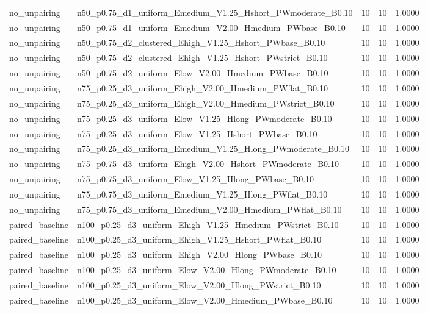 \begin{tabular}{llrrr}
no_unpairing & n50_p0.75_d1_uniform_Emedium_V1.25_Hshort_PWmoderate_B0.10 & 10 & 10 & 1.0000 \\
no_unpairing & n50_p0.75_d1_uniform_Emedium_V2.00_Hmedium_PWbase_B0.10 & 10 & 10 & 1.0000 \\
no_unpairing & n50_p0.75_d2_clustered_Ehigh_V1.25_Hshort_PWbase_B0.10 & 10 & 10 & 1.0000 \\
no_unpairing & n50_p0.75_d2_clustered_Ehigh_V1.25_Hshort_PWstrict_B0.10 & 10 & 10 & 1.0000 \\
no_unpairing & n50_p0.75_d2_uniform_Elow_V2.00_Hmedium_PWbase_B0.10 & 10 & 10 & 1.0000 \\
no_unpairing & n75_p0.25_d3_uniform_Ehigh_V2.00_Hmedium_PWflat_B0.10 & 10 & 10 & 1.0000 \\
no_unpairing & n75_p0.25_d3_uniform_Ehigh_V2.00_Hmedium_PWstrict_B0.10 & 10 & 10 & 1.0000 \\
no_unpairing & n75_p0.25_d3_uniform_Elow_V1.25_Hlong_PWmoderate_B0.10 & 10 & 10 & 1.0000 \\
no_unpairing & n75_p0.25_d3_uniform_Elow_V1.25_Hshort_PWbase_B0.10 & 10 & 10 & 1.0000 \\
no_unpairing & n75_p0.25_d3_uniform_Emedium_V1.25_Hlong_PWmoderate_B0.10 & 10 & 10 & 1.0000 \\
no_unpairing & n75_p0.75_d3_uniform_Ehigh_V2.00_Hshort_PWmoderate_B0.10 & 10 & 10 & 1.0000 \\
no_unpairing & n75_p0.75_d3_uniform_Elow_V1.25_Hlong_PWbase_B0.10 & 10 & 10 & 1.0000 \\
no_unpairing & n75_p0.75_d3_uniform_Emedium_V1.25_Hlong_PWflat_B0.10 & 10 & 10 & 1.0000 \\
no_unpairing & n75_p0.75_d3_uniform_Emedium_V2.00_Hmedium_PWflat_B0.10 & 10 & 10 & 1.0000 \\
paired_baseline & n100_p0.25_d3_uniform_Ehigh_V1.25_Hmedium_PWstrict_B0.10 & 10 & 10 & 1.0000 \\
paired_baseline & n100_p0.25_d3_uniform_Ehigh_V1.25_Hshort_PWflat_B0.10 & 10 & 10 & 1.0000 \\
paired_baseline & n100_p0.25_d3_uniform_Ehigh_V2.00_Hlong_PWbase_B0.10 & 10 & 10 & 1.0000 \\
paired_baseline & n100_p0.25_d3_uniform_Elow_V2.00_Hlong_PWmoderate_B0.10 & 10 & 10 & 1.0000 \\
paired_baseline & n100_p0.25_d3_uniform_Elow_V2.00_Hlong_PWstrict_B0.10 & 10 & 10 & 1.0000 \\
paired_baseline & n100_p0.25_d3_uniform_Elow_V2.00_Hmedium_PWbase_B0.10 & 10 & 10 & 1.0000 \\

\end{tabular}
